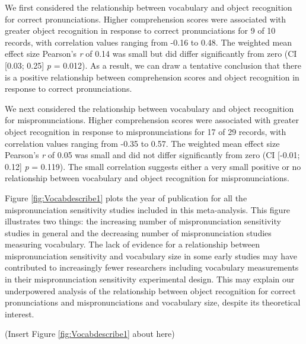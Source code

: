 \documentclass[man, noextraspace]{apa6}
\begin{document}
We first considered the relationship between vocabulary and object recognition for correct pronunciations. Higher comprehension scores were associated with greater object recognition in response to correct pronunciations for 9 of 10 records, with correlation values ranging from -0.16 to 0.48. The weighted mean effect size Pearson's \emph{r} of 0.14 was small but did differ significantly from zero (CI {[}0.03; 0.25{]} \emph{p} = 0.012). As a result, we can draw a tentative conclusion that there is a positive relationship between comprehension scores and object recognition in response to correct pronunciations.

We next considered the relationship between vocabulary and object recognition for mispronunciations. Higher comprehension scores were associated with greater object recognition in response to mispronunciations for 17 of 29 records, with correlation values ranging from -0.35 to 0.57. The weighted mean effect size Pearson's \emph{r} of 0.05 was small and did not differ significantly from zero (CI {[}-0.01; 0.12{]} \emph{p} = 0.119). The small correlation suggests either a very small positive or no relationship between vocabulary and object recognition for mispronunciations.

Figure \ref{fig:Vocabdescribe1} plots the year of publication for all the mispronunciation sensitivity studies included in this meta-analysis. This figure illustrates two things: the increasing number of mispronunciation sensitivity studies in general and the decreasing number of mispronunciation studies measuring vocabulary. The lack of evidence for a relationship between mispronunciation sensitivity and vocabulary size in some early studies may have contributed to increasingly fewer researchers including vocabulary measurements in their mispronunciation sensitivity experimental design. This may explain our underpowered analysis of the relationship between object recognition for correct pronunciations and mispronunciations and vocabulary size, despite its theoretical interest.

(Insert Figure \ref{fig:Vocabdescribe1} about here)
\end{document}
